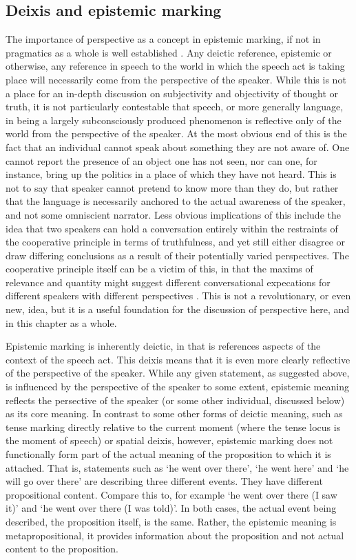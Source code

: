 \subsection{Deixis and epistemic marking}
The importance of perspective as a concept in epistemic marking, if not in pragmatics as a whole is well established \cite{Evans2005View}. Any deictic reference, epistemic or otherwise, any reference in speech to the world in which the speech act is taking place will necessarily come from the perspective of the speaker. While this is not a place for an in-depth discussion on subjectivity and objectivity of thought or truth, it is not particularly contestable that speech, or more generally language, in being a largely subconsciously produced phenomenon is reflective only of the world from the perspective of the speaker. At the most obvious end of this is the fact that an individual cannot speak about something they are not aware of. One cannot report the presence of an object one has not seen, nor can one, for instance, bring up the politics in a place of which they have not heard. This is not to say that speaker cannot pretend to know more than they do, but rather that the language is necessarily anchored to the actual awareness of the speaker, and not some omniscient narrator. Less obvious implications of this include the idea that two speakers can hold a conversation entirely within the restraints of the cooperative principle in terms of truthfulness, and yet still either disagree or draw differing conclusions as a result of their potentially varied perspectives. The cooperative principle itself can be a victim of this, in that the maxims of relevance and quantity might suggest different conversational expecations for different speakers with different perspectives \cite{BodnarukForthcoming}. This is not a revolutionary, or even new, idea, but it is a useful foundation for the discussion of perspective here, and in this chapter as a whole.

Epistemic marking is inherently deictic, in that is references aspects of the context of the speech act. This deixis means that it is even more clearly reflective of the perspective of the speaker. While any given statement, as suggested above, is influenced by the perspective of the speaker to some extent, epistemic meaning reflects the persective of the speaker (or some other individual, discussed below) as its core meaning. In contrast to some other forms of deictic meaning, such as tense marking directly relative to the current moment (where the tense locus is the moment of speech) or spatial deixis, however, epistemic marking does not functionally form part of the actual meaning of the proposition to which it is attached. That is, statements such as `he went over there', `he went here' and `he will go over there' are describing three different events. They have different propositional content. Compare this to, for example `he went over there (I saw it)' and `he went over there (I was told)'. In both cases, the actual event being described, the proposition itself, is the same. Rather, the epistemic meaning is metapropositional, it provides information about the proposition and not actual content to the proposition.

